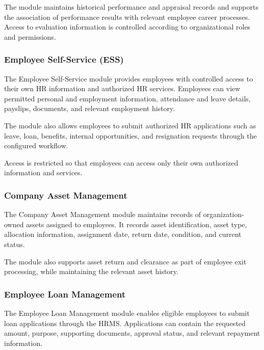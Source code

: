 \documentclass[12pt,a4paper]{article}
\begin{document}
The module maintains historical performance and appraisal records
and supports the association of performance results with relevant
employee career processes. Access to evaluation information is
controlled according to organizational roles and permissions.

\subsubsection{Employee Self-Service (ESS)}

The Employee Self-Service module provides employees with controlled
access to their own HR information and authorized HR services.
Employees can view permitted personal and employment information,
attendance and leave details, payslips, documents, and relevant
employment history.

The module also allows employees to submit authorized HR
applications such as leave, loan, benefits, internal opportunities,
and resignation requests through the configured workflow.

Access is restricted so that employees can access only their own
authorized information and services.

\subsubsection{Company Asset Management}

The Company Asset Management module maintains records of
organization-owned assets assigned to employees. It records asset
identification, asset type, allocation information, assignment
date, return date, condition, and current status.

The module also supports asset return and clearance as part of
employee exit processing, while maintaining the relevant asset
history.

\subsubsection{Employee Loan Management}

The Employee Loan Management module enables eligible employees to
submit loan applications through the HRMS. Applications can
contain the requested amount, purpose, supporting documents,
approval status, and relevant repayment information.
\end{document}
